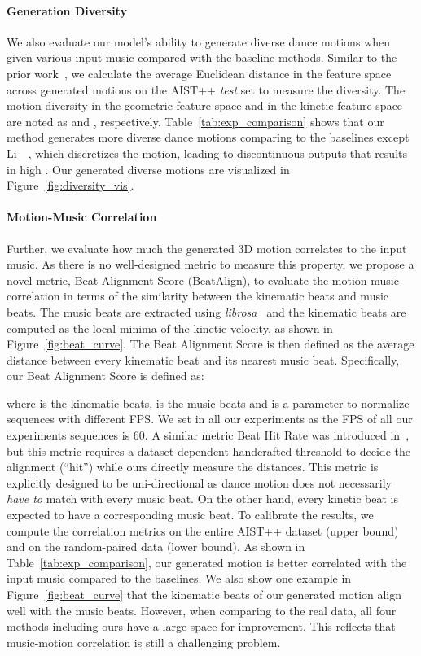 \paragraph{Generation Diversity}
We also evaluate our model's ability to generate {diverse dance motions when given various input music} compared with the baseline methods. Similar to the prior work~\cite{huang2021}, we calculate the {average Euclidean distance in the feature space across}  generated motions on the AIST++ \emph{test} set  to measure the diversity. The motion diversity in the geometric feature space and in the kinetic feature space are noted as \Divm and \Divk, respectively.
Table~\ref{tab:exp_comparison} shows that our method generates more diverse dance motions comparing to the baselines {except Li~\etal~\cite{li2020learning}, which discretizes the motion, leading to discontinuous outputs that results in high \Divk.} 
Our generated diverse motions are visualized in Figure~\ref{fig:diversity_vis}.

\vspace{-3mm}
\paragraph{Motion-Music Correlation} Further, we evaluate how much the generated 3D motion correlates to the input music. 
As there is no well-designed metric to measure this property, we propose a novel metric, Beat Alignment Score (BeatAlign), to evaluate the motion-music correlation in terms of the similarity between the kinematic beats and music beats.
The music beats are extracted using \emph{librosa}~\cite{mcfee2015librosa} and the kinematic beats are computed as the local minima of the kinetic velocity, as shown in Figure~\ref{fig:beat_curve}.
The Beat Alignment Score is then defined as the average distance between every kinematic beat and its nearest music beat. 
Specifically, our Beat Alignment Score is defined as:

where  is the kinematic beats,  is the music beats and  is a parameter to normalize sequences with different FPS. 
We set  in all our experiments as the FPS of all our experiments sequences is 60.
A similar metric Beat Hit Rate was introduced in~\cite{lee2019dance, huang2021}, but this metric requires a dataset dependent handcrafted threshold to decide the alignment (``hit'') while ours directly measure the distances. 
This metric is explicitly designed to be uni-directional as dance motion does not necessarily \emph{have to} match with every music beat. On the other hand, every kinetic beat is expected to have a corresponding music beat.
To calibrate the results, we compute the correlation metrics on the entire AIST++ dataset (upper bound) and on the random-paired data (lower bound).
As shown in Table~\ref{tab:exp_comparison}, our generated motion is better correlated with the input music compared to the baselines. We also show one example in Figure~\ref{fig:beat_curve} that the kinematic beats of our generated motion align well with the music beats.
However, when comparing to the real data, all four methods including ours have a large space for improvement. This reflects that music-motion correlation is still a challenging problem.

